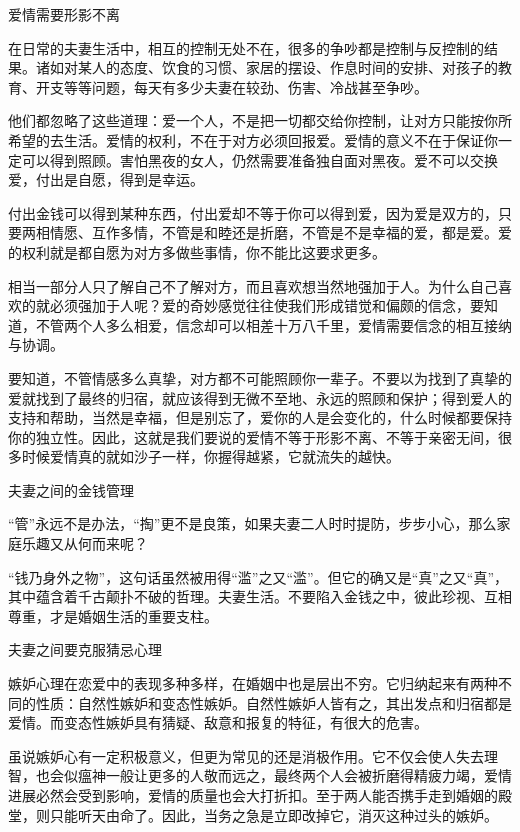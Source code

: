 \documentclass[12pt,UTF8]{ctexbook}
\begin{document}
爱情需要形影不离


在日常的夫妻生活中，相互的控制无处不在，很多的争吵都是控制与反控制的结果。诸如对某人的态度、饮食的习惯、家居的摆设、作息时间的安排、对孩子的教育、开支等等问题，每天有多少夫妻在较劲、伤害、冷战甚至争吵。

他们都忽略了这些道理：爱一个人，不是把一切都交给你控制，让对方只能按你所希望的去生活。爱情的权利，不在于对方必须回报爱。爱情的意义不在于保证你一定可以得到照顾。害怕黑夜的女人，仍然需要准备独自面对黑夜。爱不可以交换爱，付出是自愿，得到是幸运。

付出金钱可以得到某种东西，付出爱却不等于你可以得到爱，因为爱是双方的，只要两相情愿、互作多情，不管是和睦还是折磨，不管是不是幸福的爱，都是爱。爱的权利就是都自愿为对方多做些事情，你不能比这要求更多。

相当一部分人只了解自己不了解对方，而且喜欢想当然地强加于人。为什么自己喜欢的就必须强加于人呢？爱的奇妙感觉往往使我们形成错觉和偏颇的信念，要知道，不管两个人多么相爱，信念却可以相差十万八千里，爱情需要信念的相互接纳与协调。

要知道，不管情感多么真挚，对方都不可能照顾你一辈子。不要以为找到了真挚的爱就找到了最终的归宿，就应该得到无微不至地、永远的照顾和保护；得到爱人的支持和帮助，当然是幸福，但是别忘了，爱你的人是会变化的，什么时候都要保持你的独立性。因此，这就是我们要说的爱情不等于形影不离、不等于亲密无间，很多时候爱情真的就如沙子一样，你握得越紧，它就流失的越快。





夫妻之间的金钱管理


“管”永远不是办法，“掏”更不是良策，如果夫妻二人时时提防，步步小心，那么家庭乐趣又从何而来呢？

“钱乃身外之物”，这句话虽然被用得“滥”之又“滥”。但它的确又是“真”之又“真”，其中蕴含着千古颠扑不破的哲理。夫妻生活。不要陷入金钱之中，彼此珍视、互相尊重，才是婚姻生活的重要支柱。





夫妻之间要克服猜忌心理


嫉妒心理在恋爱中的表现多种多样，在婚姻中也是层出不穷。它归纳起来有两种不同的性质：自然性嫉妒和变态性嫉妒。自然性嫉妒人皆有之，其出发点和归宿都是爱情。而变态性嫉妒具有猜疑、敌意和报复的特征，有很大的危害。

虽说嫉妒心有一定积极意义，但更为常见的还是消极作用。它不仅会使人失去理智，也会似瘟神一般让更多的人敬而远之，最终两个人会被折磨得精疲力竭，爱情进展必然会受到影响，爱情的质量也会大打折扣。至于两人能否携手走到婚姻的殿堂，则只能听天由命了。因此，当务之急是立即改掉它，消灭这种过头的嫉妒。
\end{document}

